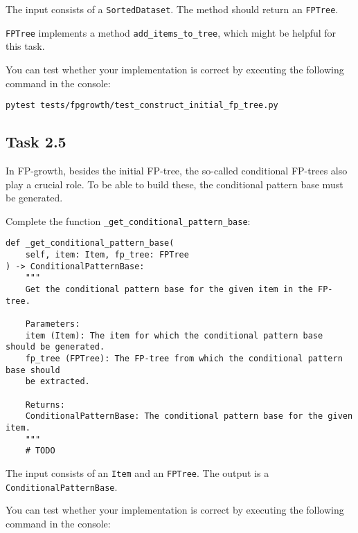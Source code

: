\documentclass[
english,
smallborders
]{i6prcsht}
\begin{document}
\vspace*{0.1cm}

The input consists of a \texttt{SortedDataset}. The method should return an \texttt{FPTree}.

\texttt{FPTree} implements a method \texttt{add\_items\_to\_tree}, which might be helpful for this task.

You can test whether your implementation is correct by executing the following command in the console:

\vspace*{0.3cm}

\begin{lstlisting}
pytest tests/fpgrowth/test_construct_initial_fp_tree.py
\end{lstlisting}

\vspace*{0.1cm}

\subsection*{Task 2.5}

In FP-growth, besides the initial FP-tree, the so-called conditional FP-trees also play a crucial role. To be able to build these, the conditional pattern base must be generated.

Complete the function \texttt{\_get\_conditional\_pattern\_base}:

\vspace*{0.3cm}

\begin{lstlisting}
def _get_conditional_pattern_base(
 	self, item: Item, fp_tree: FPTree
) -> ConditionalPatternBase:
	"""
	Get the conditional pattern base for the given item in the FP-tree.

	Parameters:
	item (Item): The item for which the conditional pattern base should be generated.
	fp_tree (FPTree): The FP-tree from which the conditional pattern base should
	be extracted.

	Returns:
	ConditionalPatternBase: The conditional pattern base for the given item.
	"""
	# TODO
\end{lstlisting}

\vspace*{0.1cm}

The input consists of an \texttt{Item} and an \texttt{FPTree}. The output is a \texttt{ConditionalPatternBase}.

You can test whether your implementation is correct by executing the following command in the console:
\end{document}
